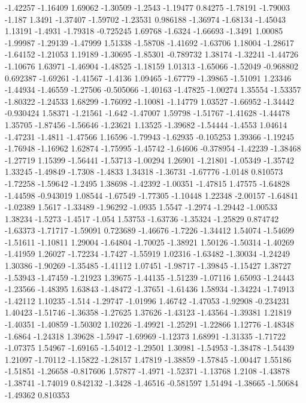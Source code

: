 \documentclass[9pt]{article}
\theoremstyle{plain}
\theoremstyle{definition}
\theoremstyle{remark}
\numberwithin{equation}{section}
\begin{document}
-1.42257
-1.16409
1.69062
-1.30509
-1.2543
-1.19477
0.84275
-1.78191
-1.79003
-1.187
1.3491
-1.37407
-1.59702
-1.23531
0.986188
-1.36974
-1.68134
-1.45043
1.13191
-1.4931
-1.79318
-0.725245
1.69768
-1.6324
-1.66693
-1.3491
1.00085
-1.99987
-1.29139
-1.47999
1.51338
-1.58708
-1.41692
-1.63706
1.18004
-1.28617
-1.64152
-1.21053
1.19189
-1.30695
-1.85301
-0.789732
1.38174
-1.32241
-1.44726
-1.10676
1.63971
-1.46904
-1.48525
-1.18159
1.01313
-1.65066
-1.52049
-0.968802
0.692387
-1.69261
-1.41567
-1.4136
1.09465
-1.67779
-1.39865
-1.51091
1.23346
-1.44934
-1.46559
-1.27506
-0.505066
-1.40163
-1.47825
-1.00274
1.35554
-1.53357
-1.80322
-1.24533
1.68299
-1.76092
-1.10081
-1.14779
1.03527
-1.66952
-1.34442
-0.930424
1.58371
-1.21561
-1.642
-1.47007
1.59798
-1.51767
-1.41628
-1.44478
1.35705
-1.87456
-1.56646
-1.23621
1.13525
-1.39682
-1.54444
-1.4553
1.04614
-1.47231
-1.4811
-1.47566
1.16596
-1.79943
-1.62935
-0.105253
1.39366
-1.19245
-1.76948
-1.16962
1.62874
-1.75995
-1.45742
-1.64606
-0.378954
-1.42239
-1.38468
-1.27719
1.15399
-1.56441
-1.53713
-1.00294
1.26901
-1.21801
-1.05349
-1.35742
1.33245
-1.49849
-1.7308
-1.4833
1.34318
-1.36731
-1.67776
-1.0148
0.810573
-1.72258
-1.59642
-1.2495
1.38698
-1.42392
-1.00351
-1.47815
1.47575
-1.64828
-1.44598
-0.943019
1.08544
-1.67549
-1.77305
-1.10448
1.22348
-2.00157
-1.64841
-1.02389
1.5617
-1.33489
-1.96292
-1.0935
1.5547
-1.2974
-1.29442
-1.00533
1.38234
-1.5273
-1.4517
-1.054
1.53753
-1.63736
-1.35324
-1.25829
0.874742
-1.63373
-1.71717
-1.59091
0.723689
-1.46676
-1.7226
-1.34412
1.54074
-1.54699
-1.51611
-1.10811
1.29004
-1.64804
-1.70025
-1.38921
1.50126
-1.50314
-1.40269
-1.41959
1.26027
-1.72234
-1.7427
-1.55919
1.02316
-1.63482
-1.30034
-1.24249
1.30386
-1.90269
-1.35485
-1.41112
1.07451
-1.98717
-1.39845
-1.15427
1.38727
-1.53943
-1.47459
-1.21923
1.39675
-1.44135
-1.51239
-1.07116
1.65093
-1.24443
-1.23566
-1.48395
1.63843
-1.48472
-1.37651
-1.61436
1.58934
-1.34224
-1.74913
-1.42112
1.10235
-1.514
-1.29747
-1.01996
1.46742
-1.47053
-1.92908
-0.234231
1.40423
-1.51746
-1.36358
-1.27625
1.37626
-1.43123
-1.43564
-1.39381
1.21819
-1.40351
-1.40859
-1.50302
1.10226
-1.49921
-1.25291
-1.22866
1.12776
-1.48348
-1.6864
-1.24318
1.39628
-1.5947
-1.69969
-1.12373
1.68991
-1.31335
-1.71722
-1.07375
1.54967
-1.69165
-1.54012
-1.29501
1.30981
-1.54953
-1.38478
-1.54439
1.21097
-1.70112
-1.15822
-1.28157
1.47819
-1.38859
-1.57845
-1.00447
1.55186
-1.51851
-1.26658
-0.817606
1.57877
-1.4971
-1.52371
-1.13768
1.2108
-1.43878
-1.38741
-1.74019
0.842132
-1.3428
-1.46516
-0.581597
1.51494
-1.38665
-1.50684
-1.49362
0.810353
\end{document}
